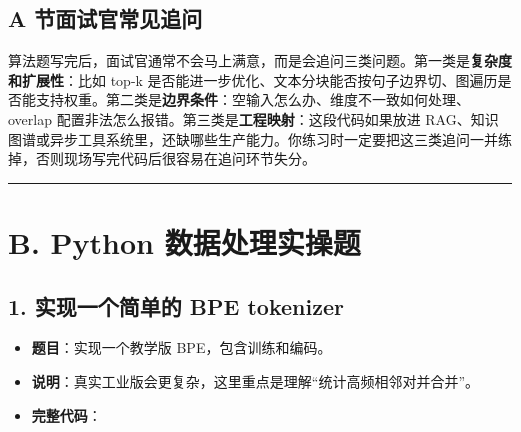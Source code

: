 \subsection{A 节面试官常见追问}
算法题写完后，面试官通常不会马上满意，而是会追问三类问题。第一类是\textbf{复杂度和扩展性}：比如 top-k 是否能进一步优化、文本分块能否按句子边界切、图遍历是否能支持权重。第二类是\textbf{边界条件}：空输入怎么办、维度不一致如何处理、overlap 配置非法怎么报错。第三类是\textbf{工程映射}：这段代码如果放进 RAG、知识图谱或异步工具系统里，还缺哪些生产能力。你练习时一定要把这三类追问一并练掉，否则现场写完代码后很容易在追问环节失分。


\bigskip\hrule\bigskip

\section{B. Python 数据处理实操题}

\subsection{1. 实现一个简单的 BPE tokenizer}
\begin{itemize}[leftmargin=2em]
\item \textbf{题目}：实现一个教学版 BPE，包含训练和编码。
\item \textbf{说明}：真实工业版会更复杂，这里重点是理解``统计高频相邻对并合并''。
\item \textbf{完整代码}：
\end{itemize}

